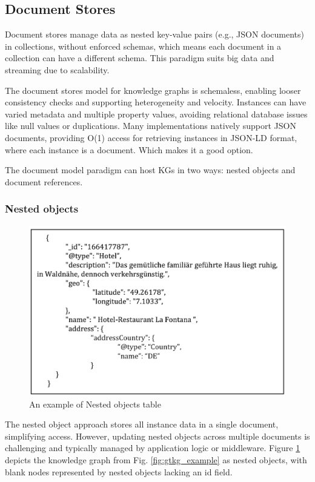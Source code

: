 \documentclass[12pt]{article}
\begin{document}
\subsection{Document Stores}
Document stores manage data as nested key-value pairs (e.g., JSON documents) in collections, without enforced schemas, which means each document in a collection can have a different schema. This paradigm suits big data and streaming due to scalability.

The document stores model for knowledge graphs is schemaless, enabling looser consistency checks and supporting heterogeneity and velocity. Instances can have varied metadata and multiple property values, avoiding relational database issues like null values or duplications. Many implementations natively support JSON documents, providing O(1) access for retrieving instances in JSON-LD format, where each instance is a document. Which makes it a good option.

The document model paradigm can host KGs in two ways: nested objects and document references.
\subsubsection{Nested objects}
\begin{figure}
    \includegraphics[width=\linewidth]{imgs/Nested objects example.jpeg}
    \caption{An example of Nested objects table}
    \label{fig:Nested-objects-example}
\end{figure}
The nested object approach stores all instance data in a single document, simplifying access. However, updating nested objects across multiple documents is challenging and typically managed by application logic or middleware.
Figure \ref{fig:Nested-objects-example} depicts the knowledge graph from Fig. \ref{fig:gtkg_example} as nested objects, with blank nodes represented by nested objects lacking an id field.
\end{document}

